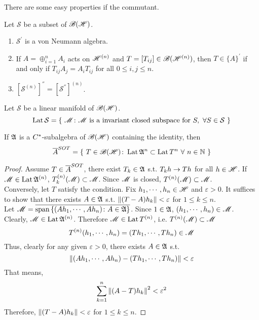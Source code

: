 \documentclass[a4paper,11pt]{report}
\begin{document}
There are some easy properties if the commutant.
\begin{prop}
	Let $\mathcal{S}$ be a subset of $\mathscr{B(H)}$.
	\begin{enumerate}[label=\arabic*)]
		\item $\mathcal{S}^{'}$ is a von Neumann algebra.
		\item If $A = \oplus_{i=1}^{n} A_i$ acts on $\mathscr{H}^{(n)}$ and $T=[T_{ij}] \in \mathscr{B}(\mathscr{H}^{(n)})$, then $T \in \{A\}^{'}$ if and only if $T_{ij}A_j=A_iT_{ij}$ for all $0 \leqslant i,j \leqslant n$.
		\item $[\mathcal{S}^{(n)}]^{''} = [\mathcal{S}^{''}]^{(n)}$.
	\end{enumerate}
\end{prop}

\begin{defn}
	Let $\mathcal{S}$ be a linear manifold of $\mathscr{B(H)}$.
	\begin{equation*}
		\operatorname{Lat}{\mathcal{S}} =\{~\mathscr{M} \colon \mathscr{M} \text{ is a invariant closed subspace for } S,~\forall S \in \mathcal{S}~\}
	\end{equation*}
\end{defn}

\begin{prop}
	If $\mathfrak{A}$ is a $C^{*}$-subalgebra of $\mathscr{B(H)}$ containing the identity, then
	\begin{equation*}
		\overline{A}^{SOT} = \{~T \in \mathscr{B(H)} \colon \operatorname{Lat}{\mathfrak{A}^n} \subset \operatorname{Lat}{T^n} ~\forall~ n \in \mathbb{N}~\}
	\end{equation*}
\end{prop}
\begin{proof}
	Assume $T \in \overline{A}^{SOT}$, there exist $T_k \in \mathfrak{A}$ s.t. $T_kh \rightarrow Th$ for all $h \in \mathscr{H}$. If $\mathscr{M} \in \operatorname{Lat}{\mathfrak{A}^{(n)}}$, $T_{k}^{(n)}(\mathscr{M}) \subset \mathscr{M}$. Since $\mathscr{M}$ is closed, $T^{(n)}(\mathscr{M}) \subset \mathscr{M}$. \\
	Conversely, let $T$ satisfy the condition. Fix $h_1,\cdots,h_n \in \mathscr{H}$ and $\varepsilon > 0$. It suffices to show that there exists $A \in \mathfrak{A}$ s.t. $\left\lVert(T-A)h_k\right\lVert < \varepsilon$ for $1 \leqslant k \leqslant n$. \\
	Let $\mathscr{M} = \overline{\operatorname{span}{\{(Ah_1,\cdots,Ah_n) \colon A \in \mathfrak{A}\}}}$. Since $1 \in \mathfrak{A}$, $(h_1,\cdots,h_n) \in \mathscr{M}$. Clearly, $\mathscr{M} \in \operatorname{Lat}{\mathfrak{A}^{(n)}}$. Therefore $\mathscr{M} \in \operatorname{Lat}{T^{(n)}}$, i.e. $T^{(n)}(\mathscr{M}) \subset \mathscr{M}$
	\begin{equation*}
		T^{(n)}(h_1,\cdots,h_n) = (Th_1,\cdots,Th_n) \in \mathscr{M}
	\end{equation*}
	Thus, clearly for any given $\varepsilon > 0$, there exists $A \in \mathfrak{A}$ s.t. 
	\begin{equation*}
		\left\lVert(Ah_1,\cdots,Ah_n)-(Th_1,\cdots,Th_n)\right\lVert < \varepsilon
	\end{equation*}
	That means,
	\begin{equation*}
		\sum_{k=1}^{n} \left\lVert(A-T)h_k\right\lVert^2 < \varepsilon^2
	\end{equation*}
	Therefore, $\left\lVert(T-A)h_k\right\lVert < \varepsilon$ for $1 \leqslant k \leqslant n$.
\end{proof}
\end{document}
